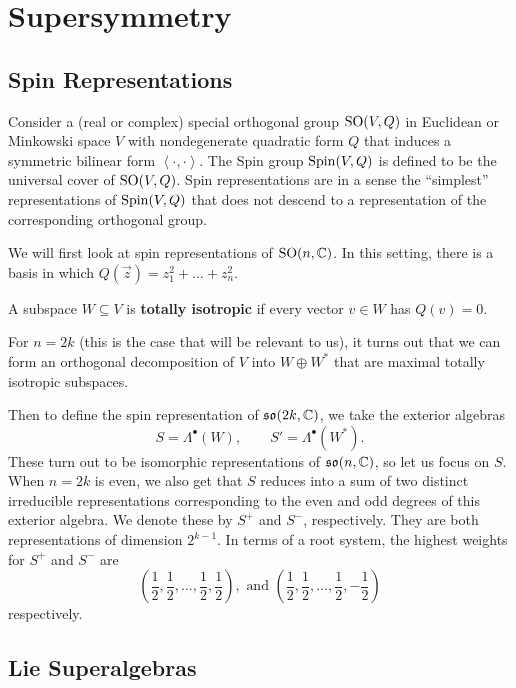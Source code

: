 	\section{Supersymmetry} %
	\label{sec:supersymmetry}
	\subsection{Spin Representations} %
	\label{sub:spin_representations}

		Consider a (real or complex) special orthogonal group $\mathrm{SO}(V, Q)$ in Euclidean or Minkowski space $V$ with nondegenerate quadratic form $Q$ that induces a symmetric bilinear form $\left < \cdot, \cdot \right>$. The Spin group $\mathrm{Spin}(V, Q)$ is defined to be the universal cover of $\mathrm{SO}(V, Q)$. Spin representations are in a sense the ``simplest'' representations of $\mathrm{Spin}(V, Q)$ that does not descend to a representation of the corresponding orthogonal group. 
		
		We will first look at spin representations of $\mathrm{SO}(n, \mathbb{C})$. In this setting, there is a basis in which $Q(\vec z) = z_1^2 + \dots + z_n^2$. 
		\begin{defn}
			A subspace $W \subseteq V$ is \textbf{totally isotropic} if every vector $v \in W$ has $Q(v) = 0$. 
		\end{defn}
		For $n=2k$ (this is the case that will be relevant to us), it turns out that we can form an orthogonal decomposition of $V$ into $W \oplus W^*$ that are maximal totally isotropic subspaces. 
		
		Then to define the spin representation of $\frak{so}(2k, \mathbb{C})$, we take the exterior algebras
		\[
			S = \Lambda^\bullet (W), \qquad S' = \Lambda^\bullet(W^*).
		\]
		These turn out to be isomorphic representations of $\frak{so}(n, \mathbb{C})$, so let us focus on $S$. When $n = 2k$ is even, we also get that $S$ reduces into a sum of two distinct irreducible representations corresponding to the even and odd degrees of this exterior algebra. We denote these by $S^+$ and $S^-$, respectively. They are both representations of dimension $2^{k-1}$. In terms of a root system, the highest weights for $S^+$ and $S^-$ are
		\[
			\left(\frac12, \frac12, \dots, \frac12, \frac12\right), \text{ and } \left(\frac12, \frac12, \dots, \frac12, -\frac12\right)
		\]
		respectively. 
		
		

	\subsection{Lie Superalgebras} %
	\label{sub:lie_superalgebras}

